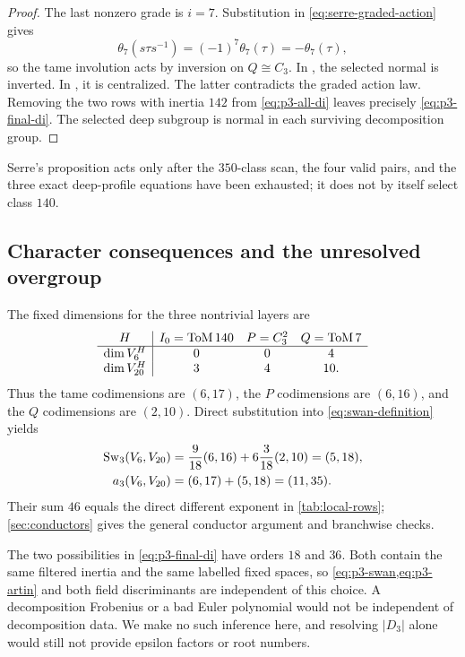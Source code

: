 \begin{proof}
The last nonzero grade is $i=7$.  Substitution in
\cref{eq:serre-graded-action} gives
\[
 \theta_7(s\tau s^{-1})=(-1)^7\theta_7(\tau)=-\theta_7(\tau),
\]
so the tame involution acts by inversion on $Q\cong C_3$.  In ,
the selected normal  is inverted.  In , it is centralized.
The latter contradicts the graded action law.  Removing the two rows with
inertia $142$ from \cref{eq:p3-all-di} leaves precisely
\cref{eq:p3-final-di}.  The selected deep subgroup is normal in each
surviving decomposition group.
\end{proof}

Serre's proposition acts only after the $350$-class scan, the four valid
pairs, and the three exact deep-profile equations have been exhausted; it
does not by itself select class $140$.

\subsection{Character consequences and the unresolved overgroup}

The fixed dimensions for the three nontrivial layers are
\begin{equation}
\begin{array}{c|ccc}
H&I_0=\mathrm{ToM}\,140&P=C_3^2&Q=\mathrm{ToM}\,7\\ \hline
\dim V_6^H&0&0&4\\
\dim V_{20}^H&3&4&10.
\end{array}
\label{eq:p3-fixed-dimensions}
\end{equation}
Thus the tame codimensions are $(6,17)$, the $P$ codimensions are $(6,16)$,
and the $Q$ codimensions are $(2,10)$.  Direct substitution into
\cref{eq:swan-definition} yields
\begin{align}
 \operatorname{Sw}_3(V_6,V_{20})
 &=\frac9{18}(6,16)+6\frac3{18}(2,10)=(5,18),
\label{eq:p3-swan}\\
 a_3(V_6,V_{20})&=(6,17)+(5,18)=(11,35).
\label{eq:p3-artin}
\end{align}
Their sum $46$ equals the direct different exponent in
\cref{tab:local-rows}; \cref{sec:conductors} gives the general conductor
argument and branchwise checks.

The two possibilities in \cref{eq:p3-final-di} have orders $18$ and $36$.
Both contain the same filtered inertia and the same labelled fixed spaces,
so \cref{eq:p3-swan,eq:p3-artin} and both field discriminants are independent
of this choice.  A decomposition Frobenius or a bad Euler polynomial would
not be independent of decomposition data.  We make no such inference here,
and resolving $|D_3|$ alone would still not provide epsilon factors or root
numbers.
